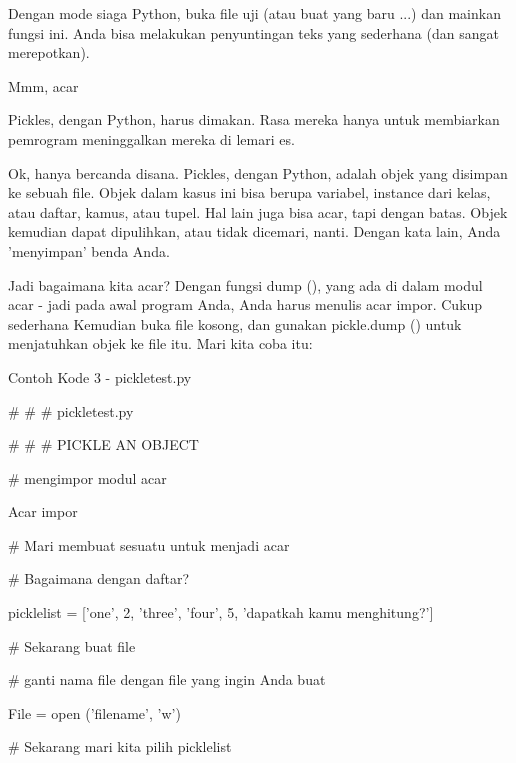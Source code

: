 \vspace{12pt}
Dengan mode siaga Python, buka file uji (atau buat yang baru ...) dan mainkan fungsi ini. Anda bisa melakukan penyuntingan teks yang sederhana (dan sangat merepotkan). \par
Mmm, acar \par
\vspace{12pt}
Pickles, dengan Python, harus dimakan. Rasa mereka hanya untuk membiarkan pemrogram meninggalkan mereka di lemari es. \par
\vspace{12pt}
Ok, hanya bercanda disana. Pickles, dengan Python, adalah objek yang disimpan ke sebuah file. Objek dalam kasus ini bisa berupa variabel, instance dari kelas, atau daftar, kamus, atau tupel. Hal lain juga bisa acar, tapi dengan batas. Objek kemudian dapat dipulihkan, atau tidak dicemari, nanti. Dengan kata lain, Anda 'menyimpan' benda Anda. \par
\vspace{12pt}
Jadi bagaimana kita acar? Dengan fungsi dump (), yang ada di dalam modul acar - jadi pada awal program Anda, Anda harus menulis acar impor. Cukup sederhana Kemudian buka file kosong, dan gunakan pickle.dump () untuk menjatuhkan objek ke file itu. Mari kita coba itu: \par
Contoh Kode 3 - pickletest.py \par
\vspace{12pt}
 $  \#  $ $  \#  $ $  \#  $ pickletest.py \par
 $  \#  $ $  \#  $ $  \#  $ PICKLE AN OBJECT \par
\vspace{12pt}
 $  \#  $ mengimpor modul acar \par
Acar impor \par
\vspace{12pt}
 $  \#  $ Mari membuat sesuatu untuk menjadi acar \par
 $  \#  $ Bagaimana dengan daftar? \par
picklelist = ['one', 2, 'three', 'four', 5, 'dapatkah kamu menghitung?'] \par
\vspace{12pt}
 $  \#  $ Sekarang buat file \par
 $  \#  $ ganti nama file dengan file yang ingin Anda buat \par
File = open ('filename', 'w') \par
\vspace{12pt}
 $  \#  $ Sekarang mari kita pilih picklelist \par
